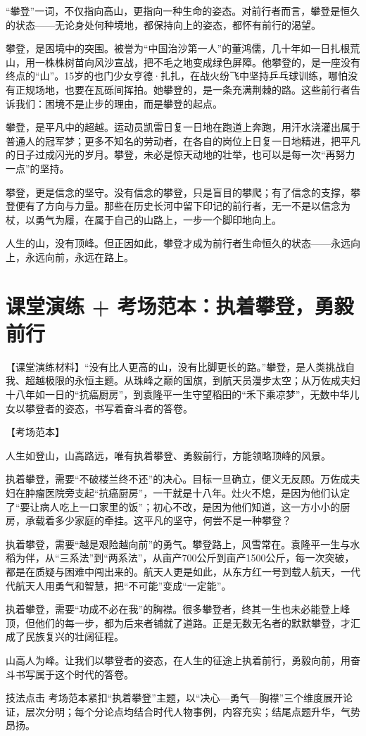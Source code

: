 “攀登”一词，不仅指向高山，更指向一种生命的姿态。对前行者而言，攀登是恒久的状态——无论身处何种境地，都保持向上的姿态，都怀有前行的渴望。

攀登，是困境中的突围。被誉为“中国治沙第一人”的董鸿儒，几十年如一日扎根荒山，用一株株树苗向风沙宣战，把不毛之地变成绿色屏障。他攀登的，是一座没有终点的“山”。15岁的也门少女亨德·扎扎，在战火纷飞中坚持乒乓球训练，哪怕没有正规场地，也要在瓦砾间挥拍。她攀登的，是一条充满荆棘的路。这些前行者告诉我们：困境不是止步的理由，而是攀登的起点。

攀登，是平凡中的超越。运动员凯雷日复一日地在跑道上奔跑，用汗水浇灌出属于普通人的冠军梦；更多不知名的劳动者，在各自的岗位上日复一日地精进，把平凡的日子过成闪光的岁月。攀登，未必是惊天动地的壮举，也可以是每一次“再努力一点”的坚持。

攀登，更是信念的坚守。没有信念的攀登，只是盲目的攀爬；有了信念的支撑，攀登便有了方向与力量。那些在历史长河中留下印记的前行者，无一不是以信念为杖，以勇气为履，在属于自己的山路上，一步一个脚印地向上。

人生的山，没有顶峰。但正因如此，攀登才成为前行者生命恒久的状态——永远向上，永远向前，永远在路上。

\clearpage
\section*{课堂演练 + 考场范本：执着攀登，勇毅前行}

【课堂演练材料】“没有比人更高的山，没有比脚更长的路。”攀登，是人类挑战自我、超越极限的永恒主题。从珠峰之巅的国旗，到航天员漫步太空；从万佐成夫妇十八年如一日的“抗癌厨房”，到袁隆平一生守望稻田的“禾下乘凉梦”，无数中华儿女以攀登者的姿态，书写着奋斗者的答卷。

【考场范本】

人生如登山，山高路远，唯有执着攀登、勇毅前行，方能领略顶峰的风景。

执着攀登，需要“不破楼兰终不还”的决心。目标一旦确立，便义无反顾。万佐成夫妇在肿瘤医院旁支起“抗癌厨房”，一干就是十八年。灶火不熄，是因为他们认定了“要让病人吃上一口家里的饭”；初心不改，是因为他们知道，这一方小小的厨房，承载着多少家庭的牵挂。这平凡的坚守，何尝不是一种攀登？

执着攀登，需要“越是艰险越向前”的勇气。攀登路上，风雪常在。袁隆平一生与水稻为伴，从“三系法”到“两系法”，从亩产700公斤到亩产1500公斤，每一次突破，都是在质疑与困难中闯出来的。航天人更是如此，从东方红一号到载人航天，一代代航天人用勇气和智慧，把“不可能”变成“一定能”。

执着攀登，需要“功成不必在我”的胸襟。很多攀登者，终其一生也未必能登上峰顶，但他们的每一步，都为后来者铺就了道路。正是无数无名者的默默攀登，才汇成了民族复兴的壮阔征程。

山高人为峰。让我们以攀登者的姿态，在人生的征途上执着前行，勇毅向前，用奋斗书写属于这个时代的答卷。

\begin{quoteBox}{技法点击}
考场范本紧扣“执着攀登”主题，以“决心—勇气—胸襟”三个维度展开论证，层次分明；每个分论点均结合时代人物事例，内容充实；结尾点题升华，气势昂扬。
\end{quoteBox}
